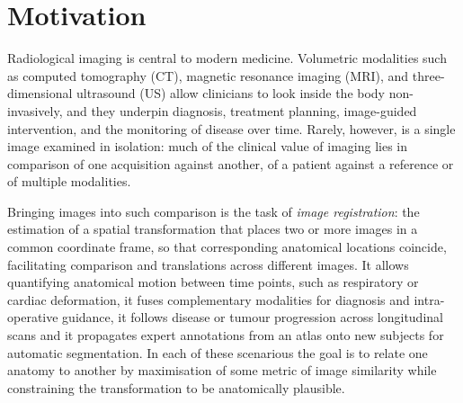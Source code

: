 \section{Motivation}

Radiological imaging is central to modern medicine. Volumetric modalities such as computed tomography (CT), magnetic resonance imaging (MRI), and three-dimensional ultrasound (US) allow clinicians to look inside the body non-invasively, and they underpin diagnosis, treatment planning, image-guided intervention, and the monitoring of disease over time. Rarely, however, is a single image examined in isolation: much of the clinical value of imaging lies in comparison of one acquisition against another, of a patient against a reference or of multiple modalities.

Bringing images into such comparison is the task of \emph{image registration}: the estimation of a spatial transformation that places two or more images in a common coordinate frame, so that corresponding anatomical locations coincide, facilitating comparison and translations across different images. It allows quantifying anatomical motion between time points, such as respiratory or cardiac deformation, it fuses complementary modalities for diagnosis and intra-operative guidance, it follows disease or tumour progression across longitudinal scans and it propagates expert annotations from an atlas onto new subjects for automatic segmentation. In each of these scenarious the goal is to relate one anatomy to another by maximisation of some metric of image similarity while constraining the transformation to be anatomically plausible.

